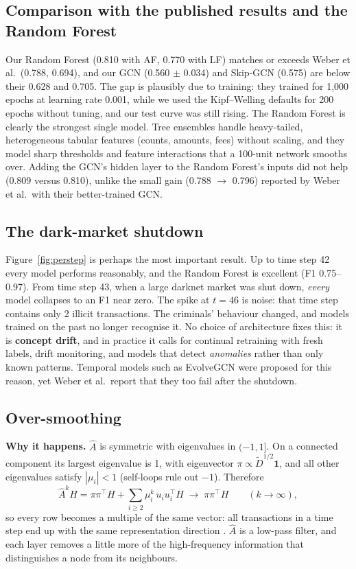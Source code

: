 \documentclass[11pt,a4paper]{article}
\newcommand{\Ahat}{\hat{A}}
\begin{document}
\subsection{Comparison with the published results and the Random Forest}
Our Random Forest (0.810 with AF, 0.770 with LF) matches or exceeds Weber et al.\ (0.788, 0.694), and our GCN (0.560 $\pm$ 0.034) and
Skip-GCN (0.575) are below their 0.628 and 0.705. The gap is plausibly due to training: they trained for 1,000 epochs at learning rate
0.001, while we used the Kipf--Welling defaults for 200 epochs without tuning, and our test curve was still rising. The Random Forest is
clearly the strongest single model. Tree ensembles handle heavy-tailed, heterogeneous tabular features (counts, amounts, fees)
without scaling, and they model sharp thresholds and feature interactions that a 100-unit network smooths over. Adding the GCN's
hidden layer to the Random Forest's inputs did not help (0.809 versus 0.810), unlike the small gain (0.788 $\to$ 0.796) reported by
Weber et al.\ with their better-trained GCN.

\subsection{The dark-market shutdown}
Figure~\ref{fig:perstep} is perhaps the most important result. Up to time step 42 every model performs reasonably, and the
Random Forest is excellent (F1 0.75--0.97). From time step 43, when a large darknet market was shut down, \emph{every} model collapses to
an F1 near zero. The spike at $t=46$ is noise: that time step contains only 2 illicit transactions. The criminals' behaviour changed,
and models trained on the past no longer recognise it. No choice of architecture fixes this: it is \textbf{concept drift}, and in
practice it calls for continual retraining with fresh labels, drift monitoring, and models that detect \emph{anomalies} rather than
only known patterns. Temporal models such as EvolveGCN \cite{evolvegcn} were proposed for this reason, yet Weber et al.\ report that
they too fail after the shutdown.

\subsection{Over-smoothing}
\textbf{Why it happens.} $\Ahat$ is symmetric with eigenvalues in $(-1,1]$. On a connected component its largest eigenvalue is 1,
with eigenvector $\pi \propto \tilde D^{1/2}\mathbf 1$, and all other eigenvalues satisfy $|\mu_i|<1$ (self-loops rule out $-1$).
Therefore
\[
  \Ahat^{k}H = \pi\pi^\top H + \sum_{i\ge2}\mu_i^{k}\,u_iu_i^\top H \;\longrightarrow\; \pi\pi^\top H \qquad (k\to\infty),
\]
so every row becomes a multiple of the same vector: all transactions in a time step end up with the same representation direction
\cite{li,oono}. $\Ahat$ is a low-pass filter, and each layer removes a little more of the high-frequency information that distinguishes
a node from its neighbours.
\end{document}
